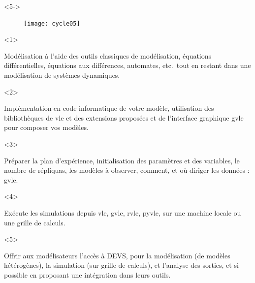 \documentclass[xetex, compress, table, svgnames]{beamer}
\begin{document}
\begin{frame}
\begin{center}
    \begin{onlyenv}<5->
      \begin{figure}[htpb]
        \begin{center}
          \texttt{[image: cycle05]}
        \end{center}
      \end{figure}
    \end{onlyenv}
  \end{center}
  \begin{onlyenv}<1>
    \begin{exampleblock}{}
      \alert{Modélisation} à l'aide des outils
      \alert{classiques} de modélisation, équations
      différentielles, équations aux différences, automates, etc.\ tout
      en restant dans une modélisation de systèmes dynamiques.
    \end{exampleblock}
  \end{onlyenv}
  \begin{onlyenv}<2>
    \begin{exampleblock}{}
      \alert{Implémentation} en code informatique de votre modèle,
      utilisation des \alert{bibliothèques} de \alert{vle} et
      des \alert{extensions proposées} et de l'interface graphique
      \alert{gvle} pour composer vos modèles.
    \end{exampleblock}
  \end{onlyenv}
  \begin{onlyenv}<3>
    \begin{exampleblock}{}
      \alert{Préparer} la plan d'expérience,
      \alert{initialisation} des paramètres et des variables, le
      nombre de \alert{répliquas}, les modèles à
      \alert{observer}, \alert{comment}, et \alert{où} diriger
      les données : \alert{gvle}.
    \end{exampleblock}
  \end{onlyenv}
  \begin{onlyenv}<4>
    \begin{exampleblock}{}
      \alert{Exécute} les simulations depuis \alert{vle},
      \alert{gvle}, \alert{rvle}, \alert{pyvle}, sur une
      machine locale ou une grille de calculs.
    \end{exampleblock}
  \end{onlyenv}
  \begin{onlyenv}<5>
    \begin{exampleblock}{}
      Offrir aux modélisateurs l'accès à DEVS, pour la
      \alert{modélisation} (de modèles hétérogènes), la
      \alert{simulation} (sur grille de calculs), et
      l'\alert{analyse} des sorties, et si possible en proposant
      une \alert{intégration} dans leurs outils.
    \end{exampleblock}
  \end{onlyenv}
\end{frame}
\end{document}
